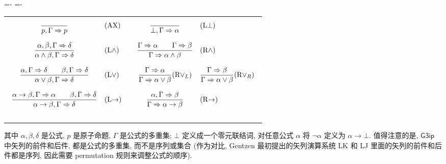 \documentclass{article}
\def\To{\Rightarrow}
\def\a{\alpha}
\def\b{\beta}
\def\d{\delta}
\def\C{\Gamma}
\def\AX{(AX)}
\def\LB{(L$\bot$)}
\def\LA{(L$\land$)}
\def\RA{(R$\land$)}
\def\LV{(L$\lor$)}
\def\RVL{(R$\lor_L$)}
\def\RVR{(R$\lor_R$)}
\def\RI{(R$\to$)}
\def\LI{(L$\to$)}
\def\Gthreeip{$ \mathsf{G3ip}$ }
\begin{document}
\begin{trivlist}
	\item
	\abovedisplayskip=-\baselineskip
	\belowdisplayskip=-\baselineskip
	\begin{tabularx}{\textwidth}{X|X}
		$$
		\begin{array}{cl}
		
		\displaystyle{\frac{} {p,\C \To p}} & \textmd{\AX} \\ \\
		\displaystyle{\frac{\a,\b,\C \To \d} {\a\land\b,\C \To \d}} & \textmd{\LA} \\ \\
		\displaystyle{\frac{\a,\C \To \d \quad\quad \b,\C \To \d} {\a\lor\b,\C \To \d}} & \textmd{\LV} \\ \\
		\displaystyle{\frac{\a\to\b,\C \To \a \quad\quad \b,\C \To \d} {\a\to\b,\C \To \d}} & \textmd{\LI} \\ \\
	
		\end{array}
		$$
		&
		$$
		\begin{array}{cl}
		
		\displaystyle{\frac{} {\bot,\C \To \a}} & \textmd{\LB} \\ \\
		\displaystyle{\frac{\C \To \a \quad\quad \C \To \b} {\C \To \a\land\b}} & \textmd{\RA} \\ \\
		\displaystyle{\frac{\C \To \a} {\C \To \a\lor\b}} \textmd{\RVL} & \displaystyle{\frac{\C \To \b} {\C \To \a\lor\b}} \textmd{\RVR} \\ \\
		\displaystyle{\frac{\a,\C \To \b} {\C \To \a\to\b}} & \textmd{\RI} \\ \\
		
		\end{array}
		$$
		
	\end{tabularx}
\end{trivlist}

其中 $\a,\b,\d$ 是公式, $p$ 是原子命题, $\C$ 是公式的多重集; $\bot$ 定义成一个零元联结词, 对任意公式 $\a$ 将 $\neg\a$ 定义为 $\a\to\bot$. 值得注意的是, \Gthreeip 中矢列的前件和后件, 都是公式的多重集, 而不是序列或集合 (作为对比, Gentzen 最初提出的矢列演算系统 LK 和 LJ 里面的矢列的前件和后件都是序列, 因此需要 permutation 规则来调整公式的顺序).  
\end{document}
